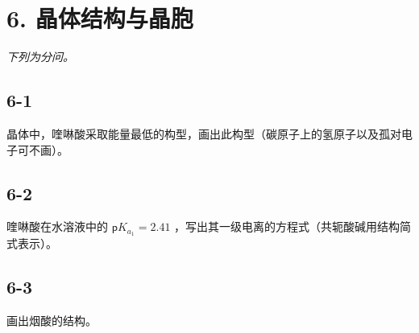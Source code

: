 \section*{6. 晶体结构与晶胞}
\textit{下列为分问。}

\subsection*{6-1}
晶体中，喹啉酸采取能量最低的构型，画出此构型（碳原⼦上的氢原⼦以及孤对电⼦可不画）。

\subsection*{6-2}
喹啉酸在⽔溶液中的 $\mathsf { p } K _ { a _ { 1 } } = 2 . 4 1$ ，写出其⼀级电离的⽅程式（共轭酸碱⽤结构简式表⽰）。

\subsection*{6-3}
画出烟酸的结构。
